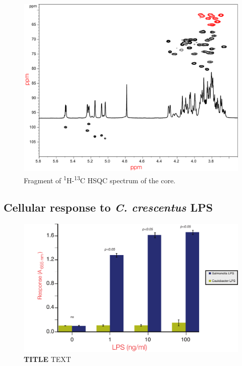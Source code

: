 		\begin{figure}[htb]
			\begin{center}
				\includegraphics[width=\textwidth]{lps_chapter/img/lpsfig4.pdf}
			\end{center}
			\caption{Fragment of \textsuperscript{1}H-\textsuperscript{13}C \ac{HSQC} spectrum of the core.}
			\label{fig:lpscorenmr}	
		\end{figure}
    \subsection{Cellular response to \textit{C. crescentus} LPS}\label{sec:cell-resp-text}

   \begin{figure}[htb]
  	\begin{center}
   		\includegraphics[width=\textwidth]{lps_chapter/img/NFkBAssay.pdf}
   	\end{center}
   	\caption[NF$\kappa$B Assay for cellular activation by LPS]{
	   	\textbf{TITLE} TEXT %
   	}
   	\label{fig:nfkbassay}
\end{figure}    


